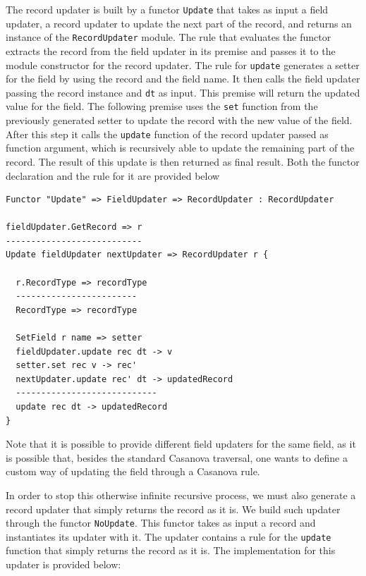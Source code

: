 \noindent
The record updater is built by a functor \texttt{Update} that takes as input a field updater, a record updater to update the next part of the record, and returns an instance of the \texttt{RecordUpdater} module. The rule that evaluates the functor extracts the record from the field updater in its premise and passes it to the module constructor for the record updater. The rule for \texttt{update} generates a setter for the field by using the record and the field name. It then calls the field updater passing the record instance and \texttt{dt} as input. This premise will return the updated value for the field. The following premise uses the \texttt{set} function from the previously generated setter to update the record with the new value of the field. After this step it calls the \texttt{update} function of the record updater passed as function argument, which is recursively able to update the remaining part of the record. The result of this update is then returned as final result. Both the functor declaration and the rule for it are provided below

\begin{lstlisting}
Functor "Update" => FieldUpdater => RecordUpdater : RecordUpdater

fieldUpdater.GetRecord => r
---------------------------
Update fieldUpdater nextUpdater => RecordUpdater r {

  r.RecordType => recordType
  ------------------------
  RecordType => recordType

  SetField r name => setter
  fieldUpdater.update rec dt -> v
  setter.set rec v -> rec'
  nextUpdater.update rec' dt -> updatedRecord
  ----------------------------
  update rec dt -> updatedRecord
}
\end{lstlisting}

\noindent
Note that it is possible to provide different field updaters for the same field, as it is possible that, besides the standard Casanova traversal, one wants to define a custom way of updating the field through a Casanova rule.

In order to stop this otherwise infinite recursive process, we must also generate a record updater that simply returns the record as it is. We build such updater through the functor \texttt{NoUpdate}. This functor takes as input a record and instantiates its updater with it. The updater contains a rule for the \texttt{update} function that simply returns the record as it is. The implementation for this updater is provided below:

